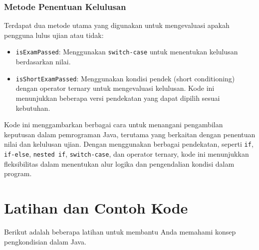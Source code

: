 \subsubsection{Metode Penentuan Kelulusan}

Terdapat dua metode utama yang digunakan untuk mengevaluasi apakah pengguna lulus ujian atau tidak:

\begin{itemize}
	\item \texttt{isExamPassed}: Menggunakan \texttt{switch-case} untuk menentukan kelulusan berdasarkan nilai.
	\item \texttt{isShortExamPassed}: Menggunakan kondisi pendek (short conditioning) dengan operator ternary untuk mengevaluasi kelulusan. Kode ini menunjukkan beberapa versi pendekatan yang dapat dipilih sesuai kebutuhan.
\end{itemize}

Kode ini menggambarkan berbagai cara untuk menangani pengambilan keputusan dalam pemrograman Java, terutama yang berkaitan dengan penentuan nilai dan kelulusan ujian. Dengan menggunakan berbagai pendekatan, seperti \texttt{if}, \texttt{if-else}, \texttt{nested if}, \texttt{switch-case}, dan operator ternary, kode ini menunjukkan fleksibilitas dalam menentukan alur logika dan pengendalian kondisi dalam program.


\section {Latihan dan Contoh Kode}

Berikut adalah beberapa latihan untuk membantu Anda memahami konsep pengkondisian dalam Java.

